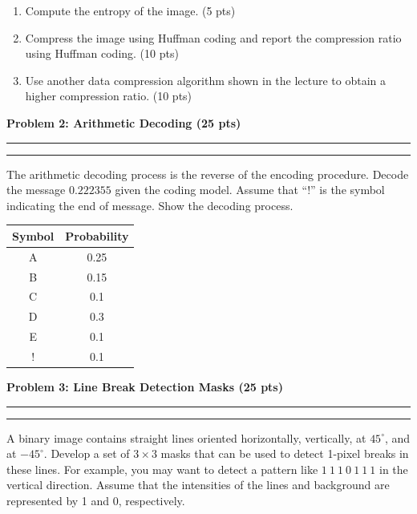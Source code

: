 \documentclass[12pt]{article}
\newcommand{\question}[1]{%
  \clearpage
  \vspace{0.5cm}
  {\noindent\normalsize \textbf{#1}}
  \vspace{0.2cm}
  \hrule
  \vspace{0.1cm}
  \hrule
  \vspace{0.3cm}
}
\begin{document}
\rmfamily
\vspace{0.3cm}

\begin{enumerate}[label=(\alph*)]
\item Compute the entropy of the image. (5 pts)
\item Compress the image using Huffman coding and report the compression ratio using Huffman coding. (10 pts)
\item Use another data compression algorithm shown in the lecture to obtain a higher compression ratio. (10 pts)
\end{enumerate}


\question{Problem 2: Arithmetic Decoding (25 pts)}\label{quest:2}

The arithmetic decoding process is the reverse of the encoding procedure. Decode the message
$0.222355$ given the coding model. Assume that ``!'' is the symbol indicating the end of message.
Show the decoding process.

\vspace{0.3cm}

\begin{center}
\begin{tabular}{cc}
\toprule
\textbf{Symbol} & \textbf{Probability} \\
\midrule
A & 0.25 \\
B & 0.15 \\
C & 0.1 \\
D & 0.3 \\
E & 0.1 \\
! & 0.1 \\
\bottomrule
\end{tabular}
\end{center}


\question{Problem 3: Line Break Detection Masks (25 pts)}\label{quest:3}

A binary image contains straight lines oriented horizontally, vertically, at $45^\circ$, and at $-45^\circ$.
Develop a set of $3 \times 3$ masks that can be used to detect 1-pixel breaks in these lines. For example,
you may want to detect a pattern like $1\ 1\ 1\ 0\ 1\ 1\ 1$ in the vertical direction. Assume that the
intensities of the lines and background are represented by 1 and 0, respectively.
\end{document}
